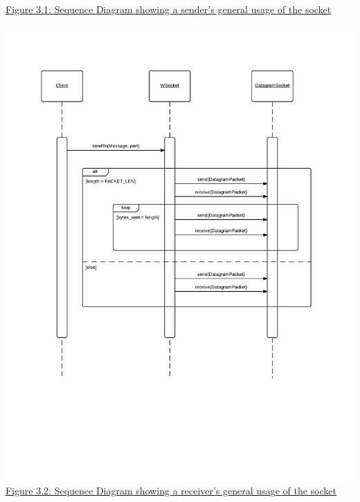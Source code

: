 \documentclass[11pt,english]{article}
\begin{document}
\newpage
\underline{Figure 3.1: Sequence Diagram showing a sender's general usage of the socket} \\
\vspace{5mm}\\
\includegraphics[width=6.2in]{figures/comm-protocol_seq-diagram_client.png}
\newpage
\underline{Figure 3.2: Sequence Diagram showing a receiver's general usage of the socket}
\vspace{5mm}\\
\end{document}
